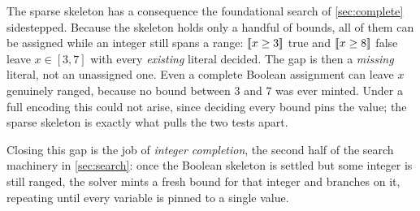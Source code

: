 The sparse skeleton has a consequence the foundational search of
\cref{sec:complete} sidestepped. Because the skeleton holds only a handful
of bounds, all of them can be assigned while an integer still spans a range:
$[\![x \ge 3]\!]$ true and $[\![x \ge 8]\!]$ false
leave $x \in [3,7]$ with every \emph{existing} literal decided. The gap is then a
\emph{missing} literal, not an unassigned one. Even a complete Boolean assignment
can leave $x$ genuinely ranged, because no bound between $3$ and $7$ was ever
minted. Under a full encoding this could not arise, since deciding every
bound pins the value; the sparse skeleton is exactly what pulls the two
tests apart.

Closing this gap is the job of \emph{integer completion}, the second half of the
search machinery in \cref{sec:search}: once the Boolean skeleton is
settled but some integer is still ranged, the solver mints a fresh bound for
that integer and branches on it, repeating until every variable is pinned to a
single value.
